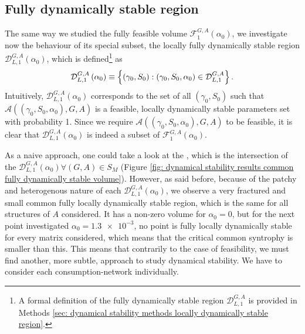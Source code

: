 \documentclass[12pt, titlepage]{report}
\begin{document}
\subsection{Fully dynamically stable region}\label{sec: dynamical stability methods fully dynamically stable region}
The same way we studied the fully feasible volume $\mathcal{F}_{1}^{G,A}(\alpha_0)$, we investigate now the behaviour of its special subset, the locally fully dynamically stable region $\mathcal{D}^{G,A}_{L,1}\left(\alpha_0\right)$, which is defined\footnote{A formal definition of the fully dynamically stable region $\mathcal{D}^{G,A}_{L,1}$ is provided in Methods \ref{sec: dynamical stability methods locally dynamically stable region}.} as
\begin{equation}
\mathcal{D}_{L,1}^{G,A}\left(\alpha_0\right) \equiv \left\{ (\gamma_0, S_0) : (\gamma_0, S_0, \alpha_0) \in \mathcal{D}^{G,A}_{L,1} \right\}.
\end{equation}
 Intuitively, $\mathcal{D}^{G,A}_{L,1}\left(\alpha_0\right)$ corresponds to the set of all $(\gamma_0, S_0)$ such that $\mathcal{A}\left((\gamma_0, S_0, \alpha_0), G, A\right)$ is a feasible, locally dynamically stable parameters set with probability 1. Since we require $\mathcal{A}\left((\gamma_0, S_0, \alpha_0), G, A\right)$ to be feasible, it is clear that $\mathcal{D}^{G,A}_{L,1}\left(\alpha_0\right)$ is indeed a subset of $\mathcal{F}^{G,A}_1\left(\alpha_0\right)$.

 As a naive approach, one could take a look at the , which is the intersection of the $\mathcal{D}_{L,1}^{G,A}(\alpha_0) \forall (G,A) \in S_M$ (Figure \ref{fig: dynamical stability results common fully dynamically stable volume}). However, as said before, because of the patchy and heterogenous nature of each $\mathcal{D}_{L,1}^{G,A}(\alpha_0)$, we observe a very fractured and small common fully locally dynamically stable region, which is the same for all structures of $A$ considered. It has a non-zero volume for $\alpha_0=0$, but for the next point investigated $\alpha_0=\num{1.3e-3}$, no point is fully locally dynamically stable for every matrix considered, which means that the critical common syntrophy is smaller than this. This means that contrarily to the case of feasibility, we must find another, more subtle, approach to study dynamical stability. We have to consider each consumption-network individually.
\end{document}
